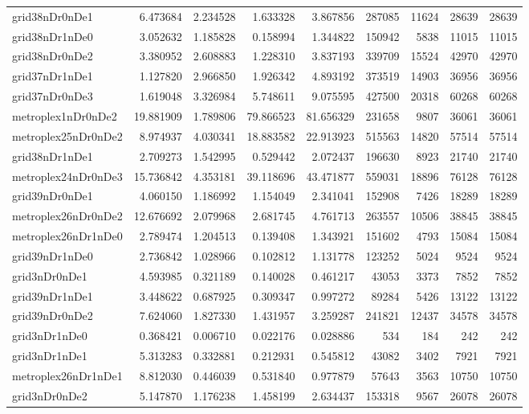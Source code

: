\documentclass[../../../thesis.tex]{subfiles}
\begin{document}
\begin{longtable}{|l|r|r|r|r|r|r|r|r|}
grid38nDr0nDe1 & 6.473684 & 2.234528 & 1.633328 & 3.867856 & 287085 & 11624 & 28639 & 28639 \\
grid38nDr1nDe0 & 3.052632 & 1.185828 & 0.158994 & 1.344822 & 150942 & 5838 & 11015 & 11015 \\
grid38nDr0nDe2 & 3.380952 & 2.608883 & 1.228310 & 3.837193 & 339709 & 15524 & 42970 & 42970 \\
grid37nDr1nDe1 & 1.127820 & 2.966850 & 1.926342 & 4.893192 & 373519 & 14903 & 36956 & 36956 \\
grid37nDr0nDe3 & 1.619048 & 3.326984 & 5.748611 & 9.075595 & 427500 & 20318 & 60268 & 60268 \\
metroplex1nDr0nDe2 & 19.881909 & 1.789806 & 79.866523 & 81.656329 & 231658 & 9807 & 36061 & 36061 \\
metroplex25nDr0nDe2 & 8.974937 & 4.030341 & 18.883582 & 22.913923 & 515563 & 14820 & 57514 & 57514 \\
grid38nDr1nDe1 & 2.709273 & 1.542995 & 0.529442 & 2.072437 & 196630 & 8923 & 21740 & 21740 \\
metroplex24nDr0nDe3 & 15.736842 & 4.353181 & 39.118696 & 43.471877 & 559031 & 18896 & 76128 & 76128 \\
grid39nDr0nDe1 & 4.060150 & 1.186992 & 1.154049 & 2.341041 & 152908 & 7426 & 18289 & 18289 \\
metroplex26nDr0nDe2 & 12.676692 & 2.079968 & 2.681745 & 4.761713 & 263557 & 10506 & 38845 & 38845 \\
metroplex26nDr1nDe0 & 2.789474 & 1.204513 & 0.139408 & 1.343921 & 151602 & 4793 & 15084 & 15084 \\
grid39nDr1nDe0 & 2.736842 & 1.028966 & 0.102812 & 1.131778 & 123252 & 5024 & 9524 & 9524 \\
grid3nDr0nDe1 & 4.593985 & 0.321189 & 0.140028 & 0.461217 & 43053 & 3373 & 7852 & 7852 \\
grid39nDr1nDe1 & 3.448622 & 0.687925 & 0.309347 & 0.997272 & 89284 & 5426 & 13122 & 13122 \\
grid39nDr0nDe2 & 7.624060 & 1.827330 & 1.431957 & 3.259287 & 241821 & 12437 & 34578 & 34578 \\
grid3nDr1nDe0 & 0.368421 & 0.006710 & 0.022176 & 0.028886 & 534 & 184 & 242 & 242 \\
grid3nDr1nDe1 & 5.313283 & 0.332881 & 0.212931 & 0.545812 & 43082 & 3402 & 7921 & 7921 \\
metroplex26nDr1nDe1 & 8.812030 & 0.446039 & 0.531840 & 0.977879 & 57643 & 3563 & 10750 & 10750 \\
grid3nDr0nDe2 & 5.147870 & 1.176238 & 1.458199 & 2.634437 & 153318 & 9567 & 26078 & 26078 \\

\end{longtable}
\end{document}
